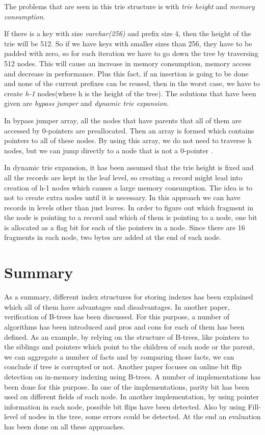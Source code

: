 \documentclass{report}
\begin{document}
The problems that are seen in this trie structure is with \textit{trie height} and \textit {memory consumption}.

If there is a key with size \textit{varchar(256)} and prefix size 4, then the height of the trie will be 512. So if we have keys with smaller sizes than 256, they have to be padded with zero, so for each iteration we have to go down the tree by traversing 512 nodes. This will cause an increase in memory consumption, memory access and decrease in performance. Plus this fact, if an insertion is going to be done and none of the current prefixes can be reused, then in the worst case, we have to create \textit{h-1} nodes(where h is the height of the tree). The solutions that have been given are \textit{bypass jumper} and \textit{dynamic trie expansion}.

In bypass jumper array, all the nodes that have parents that all of them are accessed by 0-pointers are preallocated. Then an array is formed which contains pointers to all of these nodes. By using this array, we do not need to traverse h nodes, but we can jump directly to a node that is not a 0-pointer .


In dynamic trie expansion, it has been assumed that the trie height is fixed and all the records are kept in the leaf level, so creating a record might lead into creation of h-1 nodes which causes a large memory consumption. The idea is to not to create extra nodes until it is necessary. In this approach we can have records in levels other than just leaves. In order to figure out which fragment in the node is pointing to a record and which of them is pointing to a node, one bit is allocated as a flag bit for each of the pointers in a node. Since there are 16 fragments in each node, two bytes are added at the end of each node. 




\section{Summary}

As a summary, different index structures for storing indexes has been explained which all of them have advantages and disadvantages. In another paper, verification of B-trees has been discussed. For this purpose, a number of algorithms has been introduced and pros and cons for each of them has been defined. As an example, by relying on the structure of B-trees, like pointers to the siblings and pointers which point to the children of each node or the parent, we can aggregate a number of facts and by comparing those facts, we can conclude if tree is corrupted or not.  Another paper focuses on online bit flip detection on in-memory indexing using B-trees. A number of implementations has been done for this purpose. In one of the implementations, parity bit has been used on different fields of each node. In another implementation, by using pointer information in each node, possible bit flips have been detected. Also by using Fill-level of nodes in the tree, some errors could be detected. At the end an evaluation has been done on all these approaches.
\end{document}
